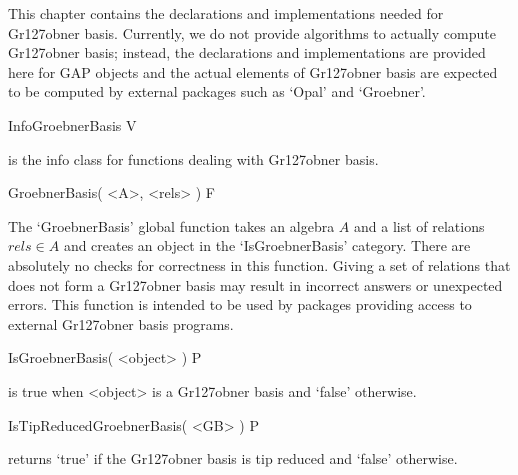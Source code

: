 %
%
%

This chapter contains the declarations and implementations needed for
Gr\accent127obner basis. Currently, we do not provide algorithms to
actually compute Gr\accent127obner basis;  instead, the declarations and
implementations are provided here for GAP objects and the actual
elements of Gr\accent127obner basis are expected to be computed by external
packages such as `Opal' and `Groebner'.

\>InfoGroebnerBasis V

is the info class for functions dealing with Gr\accent127obner basis.


\>GroebnerBasis( <A>, <rels> ) F

The `GroebnerBasis' global function takes an algebra $A$ and 
a list of relations $rels \in A$ and creates an object in the
`IsGroebnerBasis' category. There are absolutely no checks for 
correctness in this function. Giving a set of relations 
that does not form a Gr\accent127obner basis may result in incorrect 
answers or unexpected errors.  This function is intended to be 
used by packages providing access to external Gr\accent127obner basis programs.





\>IsGroebnerBasis( <object> ) P

is true when <object> is a Gr\accent127obner basis and 
`false' otherwise.

\beginexample 
\endexample


\>IsTipReducedGroebnerBasis( <GB> ) P

returns `true' if the Gr\accent127obner basis is tip reduced and 
`false' otherwise.

